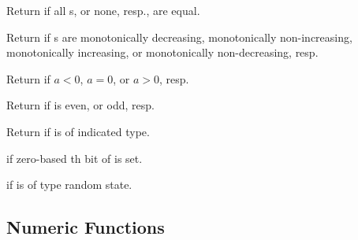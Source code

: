 \begin{LIST}{1cm}

  \index{=}%
  \index{/=}%
  Return \retval{\T} if all s, or
  none, resp.,  are equal.

  Return \retval{\T} if s are
  monotonically decreasing, monotonically non-increasing,
  monotonically increasing, or monotonically non-decreasing, resp. 

  Return \retval{\T} if $a < 0$, $a = 0$, or $a > 0$, resp.

   Return \retval{\T}
  if  is even, or odd, resp.

  Return \retval{\T} if  is of
  indicated type.

  \retval{\T} if zero-based th bit of  is set.

  \retval{\T} if  is of type random state.

\end{LIST}

\subsection{Numeric Functions} 


